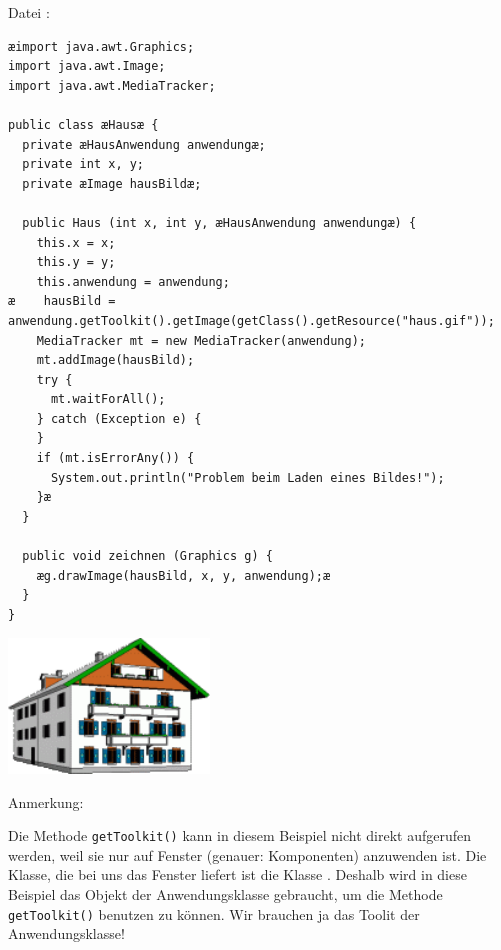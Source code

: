 \vspace{5mm}

Datei :

\begin{lstlisting}
æimport java.awt.Graphics;
import java.awt.Image;
import java.awt.MediaTracker;

public class æHausæ {
  private æHausAnwendung anwendungæ;
  private int x, y;
  private æImage hausBildæ;

  public Haus (int x, int y, æHausAnwendung anwendungæ) {
    this.x = x;
    this.y = y;
    this.anwendung = anwendung;
æ    hausBild = anwendung.getToolkit().getImage(getClass().getResource("haus.gif"));
    MediaTracker mt = new MediaTracker(anwendung);
    mt.addImage(hausBild);
    try {
      mt.waitForAll();
    } catch (Exception e) {
    }
    if (mt.isErrorAny()) {
      System.out.println("Problem beim Laden eines Bildes!");
    }æ
  }

  public void zeichnen (Graphics g) {
    æg.drawImage(hausBild, x, y, anwendung);æ
  }
}
\end{lstlisting}

\vspace{12mm}

\begin{center}
\includegraphics[width=0.4\textwidth]{./inf/SEKII/13_Java_Bilder/haus.png}
\end{center}

Anmerkung:

Die Methode \lstinline|getToolkit()| kann in diesem Beispiel nicht direkt
aufgerufen werden, weil sie nur auf Fenster (genauer: Komponenten) anzuwenden
ist. Die Klasse, die bei uns das Fenster liefert ist die Klasse
. Deshalb wird in diese Beispiel das Objekt der
Anwendungsklasse gebraucht, um die Methode \lstinline|getToolkit()| benutzen zu
können. Wir brauchen ja das Toolit der Anwendungsklasse!

